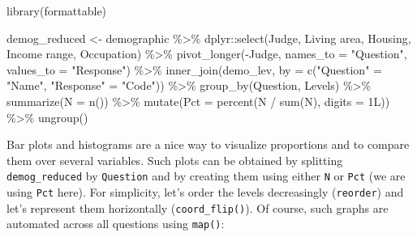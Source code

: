 \documentclass[
]{krantz}
\makeatletter
\newenvironment{Shaded}{\begin{snugshade}}{\end{snugshade}}
\newcommand{\AttributeTok}[1]{\textcolor[rgb]{0.61,0.61,0.61}{#1}}
\newcommand{\FunctionTok}[1]{\textcolor[rgb]{0,0,0}{#1}}
\newcommand{\NormalTok}[1]{#1}
\newcommand{\OtherTok}[1]{\textcolor[rgb]{0.37,0.37,0.37}{#1}}
\newcommand{\SpecialCharTok}[1]{\textcolor[rgb]{0,0,0}{#1}}
\newcommand{\StringTok}[1]{\textcolor[rgb]{0.5,0.5,0.5}{#1}}
\newenvironment{kframe}{%
\medskip{}
\setlength{\fboxsep}{.8em}
 \def\at@end@of@kframe{}%
 \ifinner\ifhmode%
  \def\at@end@of@kframe{\end{minipage}}%
  \begin{minipage}{\columnwidth}%
 \fi\fi%
 \def\FrameCommand##1{\hskip\@totalleftmargin \hskip-\fboxsep
 \colorbox{shadecolor}{##1}\hskip-\fboxsep
     \hskip-\linewidth \hskip-\@totalleftmargin \hskip\columnwidth}%
 \MakeFramed {\advance\hsize-\width
   \@totalleftmargin\z@ \linewidth\hsize
   \@setminipage}}%
 {\par\unskip\endMakeFramed%
 \at@end@of@kframe}
\renewenvironment{Shaded}{\begin{kframe}}{\end{kframe}}
\makeatother
\begin{document}
\begin{Shaded}
\begin{Highlighting}[]
\FunctionTok{library}\NormalTok{(formattable)}

\NormalTok{demog\_reduced }\OtherTok{\textless{}{-}}\NormalTok{ demographic }\SpecialCharTok{\%\textgreater{}\%}
\NormalTok{  dplyr}\SpecialCharTok{::}\FunctionTok{select}\NormalTok{(Judge, }\StringTok{\textasciigrave{}}\AttributeTok{Living area}\StringTok{\textasciigrave{}}\NormalTok{, Housing, }
                \StringTok{\textasciigrave{}}\AttributeTok{Income range}\StringTok{\textasciigrave{}}\NormalTok{, }\StringTok{\textasciigrave{}}\AttributeTok{Occupation}\StringTok{\textasciigrave{}}\NormalTok{) }\SpecialCharTok{\%\textgreater{}\%}
  \FunctionTok{pivot\_longer}\NormalTok{(}\SpecialCharTok{{-}}\NormalTok{Judge, }
               \AttributeTok{names\_to =} \StringTok{"Question"}\NormalTok{, }\AttributeTok{values\_to =} \StringTok{"Response"}\NormalTok{) }\SpecialCharTok{\%\textgreater{}\%}
  \FunctionTok{inner\_join}\NormalTok{(demo\_lev, }\AttributeTok{by =} \FunctionTok{c}\NormalTok{(}\StringTok{"Question"} \OtherTok{=} \StringTok{"Name"}\NormalTok{, }
                              \StringTok{"Response"} \OtherTok{=} \StringTok{"Code"}\NormalTok{)) }\SpecialCharTok{\%\textgreater{}\%}
  \FunctionTok{group\_by}\NormalTok{(Question, Levels) }\SpecialCharTok{\%\textgreater{}\%}
  \FunctionTok{summarize}\NormalTok{(}\AttributeTok{N =} \FunctionTok{n}\NormalTok{()) }\SpecialCharTok{\%\textgreater{}\%}
  \FunctionTok{mutate}\NormalTok{(}\AttributeTok{Pct =} \FunctionTok{percent}\NormalTok{(N }\SpecialCharTok{/} \FunctionTok{sum}\NormalTok{(N), }\AttributeTok{digits =}\NormalTok{ 1L)) }\SpecialCharTok{\%\textgreater{}\%}
  \FunctionTok{ungroup}\NormalTok{()}
\end{Highlighting}
\end{Shaded}

Bar plots and histograms are a nice way to visualize proportions and to compare them over several variables. Such plots can be obtained by splitting \texttt{demog\_reduced} by \texttt{Question} and by creating them using either \texttt{N} or \texttt{Pct} (we are using \texttt{Pct} here). For simplicity, let's order the levels decreasingly (\texttt{reorder}) and let's represent them horizontally (\texttt{coord\_flip()}). Of course, such graphs are automated across all questions using \texttt{map()}:
\end{document}
